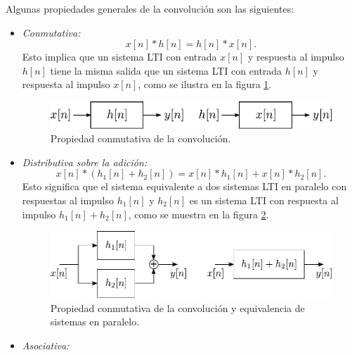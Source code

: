 \documentclass[a4paper]{report}
\begin{document}
Algunas propiedades generales de la convolución son las siguientes:
\begin{itemize}
 \item \emph{Conmutativa:}
 \[
  x[n]*h[n]=h[n]*x[n].
 \]
 Esto implica que un sistema LTI con entrada \(x[n]\) y respuesta al impulso \(h[n]\) tiene la misma salida que un sistema LTI con entrada \(h[n]\) y respuesta al impulso \(x[n]\), como se ilustra en la figura \ref{fig:lti_properties_conmutative}.
 \begin{figure}[!htb]
  \begin{minipage}[c]{0.53\textwidth}
    \includegraphics[width=\textwidth]{figuras/lti_properties_conmutative.pdf}
  \end{minipage}\hfill
  \begin{minipage}[c]{0.38\textwidth}
    \caption{
     Propiedad conmutativa de la convolución.
    }\label{fig:lti_properties_conmutative}
  \end{minipage}
\end{figure}
 \item \emph{Distributiva sobre la adición:}
 \[
  x[n]*(h_1[n]+h_2[n])=x[n]*h_1[n]+x[n]*h_2[n].
 \]
 Esto significa que el sistema equivalente a dos sistemas LTI en paralelo con respuestas al impulso \(h_1[n]\) y \(h_2[n]\) es un sistema LTI con respuesta al impulso \(h_1[n]+h_2[n]\), como se muestra en la figura \ref{fig:lti_properties_distributive}.
  \begin{figure}[!htb]
  \begin{minipage}[c]{0.6\textwidth}
    \includegraphics[width=\textwidth]{figuras/lti_properties_distributive.pdf}
  \end{minipage}\hfill
  \begin{minipage}[c]{0.3\textwidth}
    \caption{
     Propiedad conmutativa de la convolución y equivalencia de sistemas en paralelo.
    }\label{fig:lti_properties_distributive}
  \end{minipage}
 \end{figure}
 \item \emph{Asociativa:}

\end{itemize}
\end{document}
